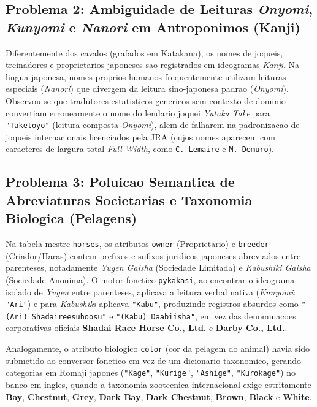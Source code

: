 \documentclass[12pt,a4paper]{article}
\begin{document}
\subsection{Problema 2: Ambiguidade de Leituras \textit{Onyomi}, \textit{Kunyomi} e \textit{Nanori} em Antroponimos (Kanji)}
Diferentemente dos cavalos (grafados em Katakana), os nomes de joqueis, treinadores e proprietarios japoneses sao registrados em ideogramas \textit{Kanji}. Na lingua japonesa, nomes proprios humanos frequentemente utilizam leituras especiais (\textit{Nanori}) que divergem da leitura sino-japonesa padrao (\textit{Onyomi}).
Observou-se que tradutores estatisticos genericos sem contexto de dominio convertiam erroneamente o nome do lendario joquei \textit{Yutaka Take} para \texttt{"Taketoyo"} (leitura composta \textit{Onyomi}), alem de falharem na padronizacao de joqueis internacionais licenciados pela JRA (cujos nomes aparecem com caracteres de largura total \textit{Full-Width}, como \texttt{C. Lemaire} e \texttt{M. Demuro}).

\subsection{Problema 3: Poluicao Semantica de Abreviaturas Societarias e Taxonomia Biologica (Pelagens)}
Na tabela mestre \texttt{horses}, os atributos \texttt{owner} (Proprietario) e \texttt{breeder} (Criador/Haras) contem prefixos e sufixos juridicos japoneses abreviados entre parenteses, notadamente \textit{Yugen Gaisha} (Sociedade Limitada) e \textit{Kabushiki Gaisha} (Sociedade Anonima).
O motor fonetico \texttt{pykakasi}, ao encontrar o ideograma isolado de \textit{Yugen} entre parenteses, aplicava a leitura verbal nativa (\textit{Kunyomi}: \texttt{"Ari"}) e para \textit{Kabushiki} aplicava \texttt{"Kabu"}, produzindo registros absurdos como \texttt{"(Ari) Shadaireesuhoosu"} e \texttt{"(Kabu) Daabiisha"}, em vez das denominacoes corporativas oficiais \textbf{Shadai Race Horse Co., Ltd.} e \textbf{Darby Co., Ltd.}.

Analogamente, o atributo biologico \texttt{color} (cor da pelagem do animal) havia sido submetido ao conversor fonetico em vez de um dicionario taxonomico, gerando categorias em Romaji japones (\texttt{"Kage"}, \texttt{"Kurige"}, \texttt{"Ashige"}, \texttt{"Kurokage"}) no banco em ingles, quando a taxonomia zootecnica internacional exige estritamente \textbf{Bay}, \textbf{Chestnut}, \textbf{Grey}, \textbf{Dark Bay}, \textbf{Dark Chestnut}, \textbf{Brown}, \textbf{Black} e \textbf{White}.
\end{document}
